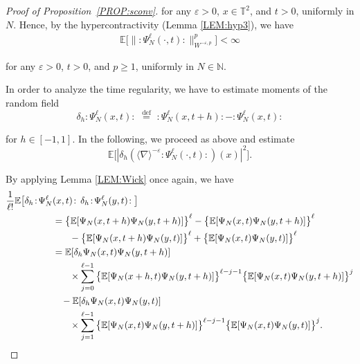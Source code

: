 \documentclass[letterpaper, 11pt,  reqno]{amsart}
\newcommand{\1}{\hspace{0.5mm}\text{I}\hspace{0.5mm}}
\newcommand{\noi}{\noindent}
\newcommand{\T}{\mathbb{T}}
\newcommand{\E}{\mathbb{E}}
\newcommand{\dl}{\delta}
\newcommand{\nb}{\nabla}
\newcommand{\Dl}{\Delta}
\newcommand{\eps}{\varepsilon}
\renewcommand{\l}{\ell}
\newcommand{\jb}[1]
{\langle #1 \rangle}
\newcommand{\N}{\mathbb{N}}
\numberwithin{equation}{section}
\numberwithin{theorem}{section}
\newcommand{\hiro}[1]{\marginpar{\color{red} $\Leftarrow\Leftarrow\Leftarrow$}{\smallskip \noi\color{blue}HIRO: #1}\smallskip}
\begin{document}
\begin{proof}[Proof of Proposition~\ref{PROP:sconv}]
\noi
\noi
for any $\eps > 0$, $x \in \T^2$, and $t > 0$, 
uniformly in $N$.
Hence,  by the hypercontractivity (Lemma \ref{LEM:hyp3}), 
we have
\begin{align*}
\E\big[\|  :\! \Psi^{\l}_N (\cdot, t) \!:\|_{W^{-\eps, p}}^p \big] 
< \infty
\end{align*}

\noi
for any $\eps > 0$, $t > 0$,  and $p \geq 1$, uniformly in $N\in \mathbb{N}$. 


%
%



In order to analyze the time regularity, 
we have to estimate moments of the random field
\[\delta_h \! :\!\Psi^{\ell}_N (x, t) \!: \, \, \stackrel{\text{def}}{=}\,  \, : \!\Psi^{\ell}_N (x, t + h) \!: - :\! \Psi_N^{\ell} (x, t)\! :\] 

\noi
for $h \in [-1, 1]$.
In the following, we proceed as above and estimate
\[\mathbb{E} \big[|\dl_h (\jb{\nb}^{-\eps} : \! \Psi_N^{\ell} (\cdot, t ) \!:) (x) |^2 \big].\]

\noi 
By applying Lemma \ref{LEM:Wick} once again, we have
\begin{align*}
\frac{1}{\l!}\E \big[\delta_h \! :\! \Psi^{\ell}_N & (x, t) \!: \,  \delta_h\! :\! \Psi^{\ell}_N (y, t)\!:  \big]\notag\\
 & =  \big\{\mathbb{E} [\Psi_N (x, t + h) \Psi_N (y, t + h)]\big\}^\l 
    - \big\{\E [\Psi_N ( x, t) \Psi_N (y, t + h)]\big\}^\l \\
  & \hphantom{XX}
    - \big\{\E [\Psi_N (x, t + h) \Psi_N (y, t)]\big\}^\l 
+   \big\{\E [\Psi_N (x, t) \Psi_N (y, t)]\big\}^\l \nonumber\\
  & = \mathbb{E} [\dl_h \Psi_N ( x, t) \Psi_N (y, t + h)] \\
& \hphantom{XX}
\times   \sum_{j = 0}^{\l-1}    \big\{\mathbb{E} [ \Psi_N ( x+h, t) \Psi_N (y, t + h)]\big\}^{\l-j-1} 
   \big\{\mathbb{E} [ \Psi_N ( x, t) \Psi_N (y, t + h)]\big\}^j \\
& \hphantom{X}
- \mathbb{E} [\dl_h \Psi_N ( x, t) \Psi_N (y, t )] \\
& 
\hphantom{XX}
\times   \sum_{j = 1}^{\l-1}    \big\{\mathbb{E} [ \Psi_N ( x, t) \Psi_N (y, t + h)]\big\}^{\l-j-1} 
   \big\{\mathbb{E} [ \Psi_N ( x, t) \Psi_N (y, t )]\big\}^j .
\end{align*}


\end{proof}
\end{document}
